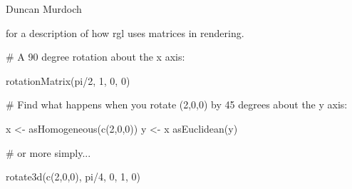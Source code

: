 \begin{Author}\relax
Duncan Murdoch
\end{Author}
\begin{SeeAlso}\relax
{} for a description of how rgl uses matrices in
rendering.
\end{SeeAlso}
\begin{Examples}
\begin{ExampleCode}
# A 90 degree rotation about the x axis:

rotationMatrix(pi/2, 1, 0, 0)

# Find what happens when you rotate (2,0,0) by 45 degrees about the y axis:

x <- asHomogeneous(c(2,0,0))
y <- x 
asEuclidean(y)

# or more simply...

rotate3d(c(2,0,0), pi/4, 0, 1, 0)

\end{ExampleCode}
\end{Examples}

